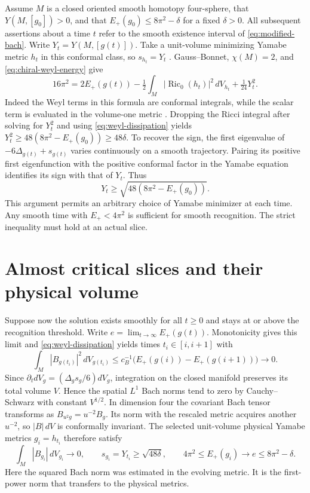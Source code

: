 \documentclass[11pt]{article}
\numberwithin{equation}{section}
\DeclareMathOperator{\Ric}{Ric}
\begin{document}
Assume \(M\) is a closed oriented smooth homotopy four-sphere, that
\(Y(M,[g_0])>0\), and that \(E_+(g_0)\le 8\pi^2-\delta\) for a fixed
\(\delta>0\). All subsequent assertions about a time \(t\) refer to
the smooth existence interval of \eqref{eq:modified-bach}. Write
\(Y_t=Y(M,[g(t)])\). Take a unit-volume minimizing Yamabe metric \(h_t\)
in this conformal class, so \(s_{h_t}=Y_t\)
\cite{LeeParker1987Yamabe}. Gauss--Bonnet, \(\chi(M)=2\), and
\eqref{eq:chiral-weyl-energy} give
\begin{equation}\label{eq:yamabe-budget}
 16\pi^2=2E_+(g(t))-\tfrac12\int_M|\Ric_0(h_t)|^2\,dV_{h_t}
                     +\tfrac1{24}Y_t^2 .
\end{equation}
Indeed the Weyl terms in this formula are conformal integrals,
while the scalar term is evaluated in the volume-one metric
\cite[eq.~(0.4)]{ChangGurskyYang2003}. Dropping the Ricci integral
after solving for \(Y_t^2\) and using \eqref{eq:weyl-dissipation}
yields \(Y_t^2\ge 48(8\pi^2-E_+(g_0))\ge48\delta\).
To recover the sign, the first eigenvalue of
\(-6\Delta_{g(t)}+s_{g(t)}\) varies continuously on a smooth
trajectory. Pairing its positive first eigenfunction with the
positive conformal factor in the Yamabe equation identifies its
sign with that of \(Y_t\). Thus
\[
 Y_t\ge\sqrt{48(8\pi^2-E_+(g_0))}.
\]
This argument permits an arbitrary choice of Yamabe minimizer at
each time. Any smooth time with \(E_+<4\pi^2\) is sufficient for smooth
recognition. The strict inequality must hold at an actual slice.

\section{Almost critical slices and their physical volume}

Suppose now the solution exists smoothly for all \(t\ge0\) and stays
at or above the recognition threshold. Write
\(e=\lim_{t\to\infty}E_+(g(t))\). Monotonicity gives this limit and
\eqref{eq:weyl-dissipation} yields times \(t_i\in[i,i+1]\) with
\[
 \int_M |B_{g(t_i)}|^2\,dV_{g(t_i)}
 \le c_B^{-1}\bigl(E_+(g(i))-E_+(g(i+1))\bigr)\longrightarrow0 .
\]
Since \(\partial_t dV_g=(\Delta_gs_g/6)dV_g\), integration on the
closed manifold preserves its total volume \(V\). Hence the spatial
\(L^1\) Bach norms tend to zero by Cauchy--Schwarz with constant
\(V^{1/2}\). In dimension four the covariant Bach tensor transforms as
\(B_{u^2g}=u^{-2}B_g\). Its norm with the rescaled metric acquires
another \(u^{-2}\), so \(|B|\,dV\) is conformally invariant.
The selected unit-volume physical Yamabe metrics \(g_i=h_{t_i}\)
therefore satisfy
\begin{equation}\label{eq:sequence}
 \int_M |B_{g_i}|\,dV_{g_i}\longrightarrow0,\qquad
 s_{g_i}=Y_{t_i}\ge\sqrt{48\delta},\qquad
 4\pi^2\le E_+(g_i)\longrightarrow e\le8\pi^2-\delta .
\end{equation}
Here the squared Bach norm was estimated in the evolving metric.
It is the first-power norm that transfers to the physical metrics.
\end{document}
